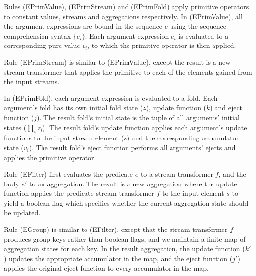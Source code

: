 
Rules (EPrimValue), (EPrimStream) and (EPrimFold) apply primitive operators to constant values, streams and aggregations respectively.
In (EPrimValue), all the argument expressions are bound in the sequence $e$ using the sequence comprehension syntax $\{e_i\}$.
Each argument expression $e_i$ is evaluated to a corresponding pure value $v_i$, to which the primitive operator is then applied.

Rule (EPrimStream) is similar to (EPrimValue), except the result is a new stream transformer that applies the primitive to each of the elements gained from the input streams.

In (EPrimFold), each argument expression is evaluated to a fold.
Each argument's fold has its own initial fold state ($z$), update function ($k$) and eject function ($j$).
The result fold's initial state is the tuple of all arguments' initial states ($\prod_i z_i$).
The result fold's update function applies each argument's update functions to the input stream element ($s$) and the corresponding accumulator state ($v_i$).
The result fold's eject function performs all arguments' ejects and applies the primitive operator.


Rule (EFilter) first evaluates the predicate $e$ to a stream transformer $f$, and the body $e'$ to an aggregation. The result is a new aggregation where the update function applies the predicate stream transformer $f$ to the input element $s$ to yield a boolean flag which specifies whether the current aggregation state should be updated.

Rule (EGroup) is similar to (EFilter), except that the stream transformer $f$ produces group keys rather than boolean flags, and we maintain a finite map of aggregation states for each key. In the result aggregation, the update function ($k'$) updates the appropriate accumulator in the map, and the eject function ($j'$) applies the original eject function to every accumulator in the map. 


